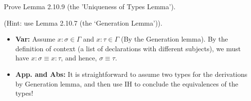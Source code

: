 \begin{problem}{2.17}
     Prove Lemma 2.10.9 (the 'Uniqueness of Types Lemma').
    
    (Hint: use Lemma 2.10.7 (the `Generation Lemma')).
\end{problem}

\begin{solution}
    \begin{itemize}
        \item \textbf{Var:} Assume $x:\sigma \in \Gamma$ and $x:\tau \in \Gamma$ (By the Generation lemma). By the definition of context (a list of declarations with different subjects), we must have $x:\sigma \equiv x:\tau$, and hence, $\sigma \equiv \tau$.
        \item \textbf{App. and Abs:} It is straightforward to assume two types for the derivations by Generation lemma, and then use IH to conclude the equivalences of the types! 
    \end{itemize}
\end{solution}